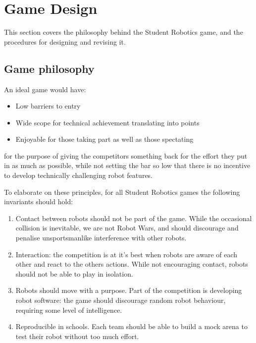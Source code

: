 \section{Game Design}

This section covers the philosophy behind the Student Robotics game, and the
procedures for designing and revising it.

\subsection{Game philosophy}

An ideal game would have:
\begin{itemize}
	\item Low barriers to entry
	\item Wide scope for technical achievement translating into points
	\item Enjoyable for those taking part as well as those spectating
\end{itemize}

for the purpose of giving the competitors something back for the effort they
put in as much as possible, while not setting the bar so low that there is no
incentive to develop technically challenging robot features.

To elaborate on these principles, for all Student Robotics games the following
invariants should hold:
\begin{enumerate}
	\item Contact between robots should not be part of the game. While the occasional collision is inevitable, we are not Robot Wars, and should discourage and penalise unsportsmanlike interference with other robots.
	\item Interaction: the competition is at it's best when robots are aware of each other and react to the others actions. While not encouraging contact, robots should not be able to play in isolation.
	\item Robots should move with a purpose. Part of the competition is developing robot software: the game should discourage random robot behaviour, requiring some level of intelligence.
	\item Reproducible in schools. Each team should be able to build a mock arena to test their robot without too much effort.
\end{enumerate}

